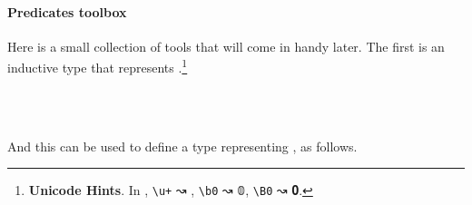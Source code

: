 \paragraph*{Predicates toolbox}
Here is a small collection of tools that will come in handy later. The first is an inductive type that represents .\footnote{\label{uhints}%
  \textbf{Unicode Hints}. In \agdamode, \texttt{\textbackslash{}u+} ↝ , \texttt{\textbackslash{}b0} ↝ \af 𝟘, \texttt{\textbackslash{}B0} ↝ \af 𝟎.}
\ccpad %
\begin{code}
\>[0]\AgdaSpace{}%
\AgdaSpace{}%
\AgdaSymbol{(}\AgdaSpace{}%
\AgdaSymbol{:}\AgdaSpace{}%
\AgdaSpace{}%
\AgdaSymbol{)}\AgdaSpace{}%
\AgdaSymbol{(}\AgdaSpace{}%
\AgdaSymbol{:}\AgdaSpace{}%
\AgdaSpace{}%
\AgdaSymbol{)}\AgdaSpace{}%
\AgdaSymbol{:}\AgdaSpace{}%
\AgdaSpace{}%
\AgdaSpace{}%
\AgdaSpace{}%
\AgdaSpace{}%
\<%
\\
\>[0][@{}l@{\AgdaIndent{0}}]%
\>[1]\AgdaSpace{}%
\AgdaSymbol{:}\AgdaSpace{}%
\AgdaSymbol{(}\AgdaSpace{}%
\AgdaSymbol{:}\AgdaSpace{}%
\AgdaSymbol{)}\AgdaSpace{}%
\AgdaSpace{}%
\AgdaSpace{}%
\AgdaSpace{}%
\<%
\\
%
\>[1]\AgdaSpace{}%
\AgdaSymbol{:}\AgdaSpace{}%
\AgdaSymbol{(}\AgdaSpace{}%
\AgdaSymbol{:}\AgdaSpace{}%
\AgdaSymbol{)}\AgdaSpace{}%
\AgdaSpace{}%
\AgdaSpace{}%
\AgdaSpace{}%
\<%
\end{code}
\ccpad
And this can be used to define a type representing , as follows.
\ccpad
